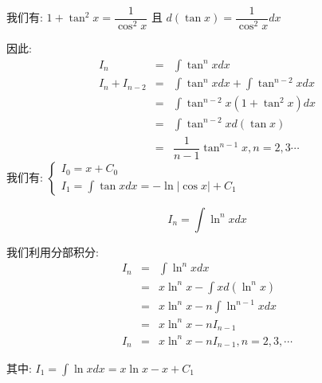 \begin{theorem}[递归积分]
\begin{solution}
		我们有: $1+\tan^{2} x = \dfrac{1}{\cos^{2} x}$ 且 $d(\tan x) = \dfrac{1}{\cos^{2} x}dx$

		因此:
		\begin{eqnarray*}
			I_{n} &=& \int \tan^{n} xdx\\
			I_{n} +I_{n-2}&=& \int \tan^{n} xdx + \int \tan^{n-2}xdx\\
				          &=& \int \tan^{n-2} x(1+\tan^{2}x)dx\\
				          &=& \int \tan^{n-2} x d(\tan x)\\
				          &=& \dfrac{1}{n-1}\tan^{n-1} x, n = 2,3\cdots
		\end{eqnarray*}
		我们有: $\begin{cases} I_{0} = x + C_{0}  \\ I_{1} = \int \tan xdx = -\ln|\cos x|+C_{1} \end{cases}$
	\end{solution}
	\begin{proposition}
		$$I_{n} = \int \ln^{n} xdx$$ 
	\end{proposition}
	\begin{solution}

		我们利用分部积分:
		\begin{eqnarray*}
			I_{n} &=& \int \ln^{n} xdx\\
			      &=& x\ln^{n}x - \int xd(\ln^{n}x)\\
				  &=& x\ln^{n}x - n\int \ln^{n-1} x dx\\
			      &=& x\ln^{n} x -n I_{n-1}\\
			I_{n} &=& x\ln^{n} x -n I_{n-1}, n = 2,3,\cdots 
		\end{eqnarray*}

		其中: $I_{1} = \int \ln xdx = x\ln x -x +C_{1}$
	\end{solution}
\end{theorem}
